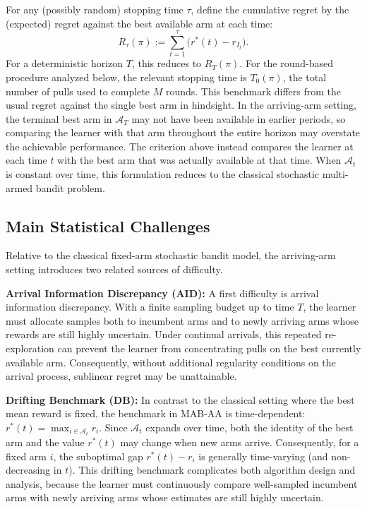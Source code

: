 \documentclass[
  12pt]{article}
\begin{document}
For any (possibly random) stopping time $\tau$, define the cumulative regret by the (expected) regret against the best available arm at each time:
\[
R_{\tau}(\pi):=\sum_{t=1}^{\tau}\bigl(r^*(t)-r_{I_t}\bigr).
\]
For a deterministic horizon $T$, this reduces to $R_T(\pi)$. For the round-based procedure analyzed below,
the relevant stopping time is $T_0(\pi)$, the total number of pulls used to complete $M$
rounds. 
This benchmark differs from the usual regret against the single best arm in hindsight. In the arriving-arm setting, the terminal best arm in \(\mathcal{A}_T\) may not have been available in earlier periods, so comparing the learner with that arm throughout the entire horizon may overstate the achievable performance. The criterion above instead compares the learner at each time \(t\) with the best arm that was actually available at that time. When \(\mathcal{A}_t\) is constant over time, this formulation reduces to the classical stochastic multi-armed bandit problem.



\subsection{Main Statistical Challenges}
Relative to the classical fixed-arm stochastic bandit model, the arriving-arm setting introduces two related sources of difficulty.

\textbf{Arrival Information Discrepancy (AID):}
A first difficulty is arrival information discrepancy. With a finite sampling budget up to time $T$, the learner must allocate samples both to incumbent arms and to newly arriving arms whose rewards are still highly uncertain. Under continual arrivals, this repeated re-exploration can prevent the learner from concentrating pulls on the best currently available arm. Consequently, without additional regularity conditions on the arrival process, sublinear regret may be unattainable.

\textbf{Drifting Benchmark (DB):}
In contrast to the classical setting where the best mean reward is fixed, the benchmark in MAB-AA is time-dependent: $r^*(t)=\max_{i\in \mathcal{A}_t} r_i$. Since $\mathcal{A}_t$ expands over time, both the identity of the best arm and the value $r^*(t)$ may change when new arms arrive. Consequently, for a fixed arm $i$, the suboptimal gap $r^*(t)-r_i$ is generally time-varying (and non-decreasing in $t$). This drifting benchmark complicates both algorithm design and analysis, because the learner must continuously compare well-sampled incumbent arms with newly arriving arms whose estimates are still highly uncertain.
\end{document}
